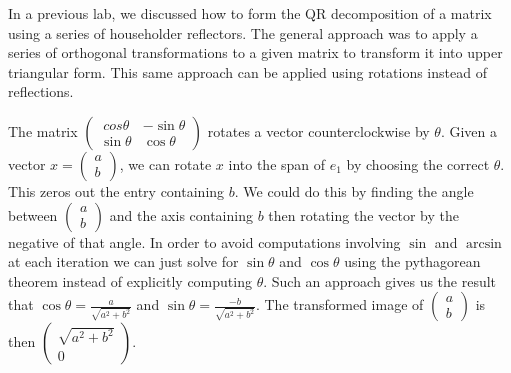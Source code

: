 \label{lab:givens}

In a previous lab, we discussed how to form the QR decomposition of a matrix using a series of householder reflectors.
The general approach was to apply a series of orthogonal transformations to a given matrix to transform it into upper triangular form.
This same approach can be applied using rotations instead of reflections.

The matrix $\begin{pmatrix}\ cos \theta & - \sin \theta \\ \sin \theta & \cos \theta \end{pmatrix}$ rotates a vector counterclockwise by $\theta$.
Given a vector $x = \begin{pmatrix} a \\ b \end{pmatrix}$, we can rotate $x$ into the span of $e_1$ by choosing the correct $\theta$.
This zeros out the entry containing $b$.
We could do this by finding the angle between $\begin{pmatrix} a \\ b \end{pmatrix}$ and the axis containing $b$ then rotating the vector by the negative of that angle.
In order to avoid computations involving $\sin$ and $\arcsin$ at each iteration we can just solve for $\sin \theta $ and $\cos \theta$ using the pythagorean theorem instead of explicitly computing $\theta$.
Such an approach gives us the result that $\cos \theta = \frac{a}{\sqrt{a^2 + b^2}}$ and $\sin \theta = \frac{- b}{\sqrt{a^2 + b^2}}$.
The transformed image of $\begin{pmatrix} a \\ b \end{pmatrix}$ is then $\begin{pmatrix} \sqrt{a^2 + b^2} \\ 0 \end{pmatrix}$.

